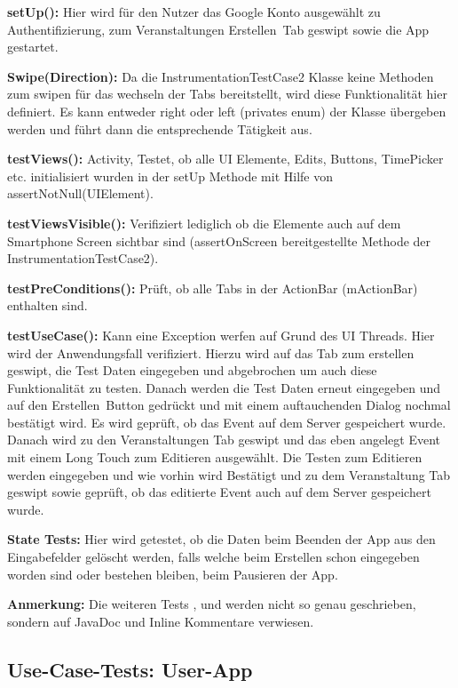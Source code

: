 \textbf{setUp():} Hier wird für den Nutzer das Google Konto ausgewählt zu Authentifizierung, zum \glqq Veranstaltungen Erstellen\grqq\ Tab geswipt sowie die App gestartet.

\textbf{Swipe(Direction):} Da die InstrumentationTestCase2 Klasse keine Methoden zum swipen für das wechseln der Tabs bereitstellt, wird diese Funktionalität hier definiert. Es kann entweder right oder left (privates enum) der Klasse übergeben werden und führt dann die entsprechende Tätigkeit aus.

\textbf{testViews():} Activity, Testet, ob alle UI Elemente, Edits, Buttons, TimePicker etc. initialisiert wurden in der setUp Methode mit Hilfe von assertNotNull(UIElement).

\textbf{testViewsVisible():} Verifiziert lediglich ob die Elemente auch auf dem Smartphone Screen sichtbar sind (assertOnScreen bereitgestellte Methode der InstrumentationTestCase2).

\textbf{testPreConditions():} Prüft, ob alle Tabs in der ActionBar (mActionBar) enthalten sind.

\textbf{testUseCase():} Kann eine Exception werfen auf Grund des UI Threads. Hier wird der Anwendungsfall verifiziert. Hierzu wird auf das Tab zum erstellen geswipt, die Test Daten eingegeben und abgebrochen um auch diese Funktionalität zu testen. Danach werden die Test Daten erneut eingegeben und auf den \glqq Erstellen\grqq\ Button gedrückt und mit einem auftauchenden Dialog nochmal bestätigt wird. Es wird geprüft, ob das Event auf dem Server gespeichert wurde. Danach wird zu den Veranstaltungen Tab geswipt und das eben angelegt Event mit einem Long Touch zum Editieren ausgewählt. Die Testen zum Editieren werden eingegeben und wie vorhin wird Bestätigt und zu dem Veranstaltung Tab geswipt sowie geprüft, ob das editierte Event auch auf dem Server gespeichert wurde.

\textbf{State Tests:} Hier wird getestet, ob die Daten beim Beenden der App aus den Eingabefelder gelöscht werden, falls welche beim Erstellen schon eingegeben worden sind oder bestehen bleiben, beim Pausieren der App.

\textbf{Anmerkung:} Die weiteren Tests ,  und  werden nicht so genau geschrieben, sondern auf JavaDoc und Inline Kommentare verwiesen.


\subsection{Use-Case-Tests: User-App}
